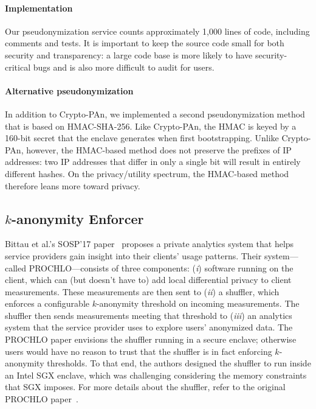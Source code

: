 \paragraph{Implementation}
Our pseudonymization service counts approximately 1,000 lines of code, including
comments and tests.  It is important to keep the source code small for both
security and transparency: a large code base is more likely to have
security-critical bugs and is also more difficult to audit for users.

\paragraph{Alternative pseudonymization}
In addition to Crypto-PAn, we implemented a second pseudonymization method that
is based on HMAC-SHA-256.  Like Crypto-PAn, the HMAC is keyed by a 160-bit
secret that the enclave generates when first bootstrapping.  Unlike Crypto-PAn,
however, the HMAC-based method does not preserve the prefixes of IP addresses:
two IP addresses that differ in only a single bit will result in entirely
different hashes.  On the privacy/utility spectrum, the HMAC-based method
therefore leans more toward privacy.

\subsection{$k$-anonymity Enforcer}
\label{sec:shuffler}

Bittau et al.'s SOSP'17 paper~\cite{Bittau2017a} proposes a private analytics
system that helps service providers gain insight into their clients' usage
patterns.  Their system---called PROCHLO---consists of three components:
(\emph{i}) software running on the client, which can (but doesn't have to) add
local differential privacy to client measurements.  These measurements are then
sent to (\emph{ii}) a shuffler, which enforces a configurable $k$-anonymity
threshold on incoming measurements.  The shuffler then sends measurements meeting that threshold
to (\emph{iii}) an analytics system that the service provider uses
to explore users' anonymized data.  The PROCHLO paper envisions the shuffler
running in a secure enclave; otherwise users would have no reason to trust that the
shuffler is in fact enforcing $k$-anonymity thresholds.  To that end, the
authors designed the shuffler to run inside an Intel SGX enclave, which was
challenging considering the memory constraints that SGX imposes.  For more
details about the shuffler, refer to the original PROCHLO
paper~\cite[\S~3.3]{Bittau2017a}.


